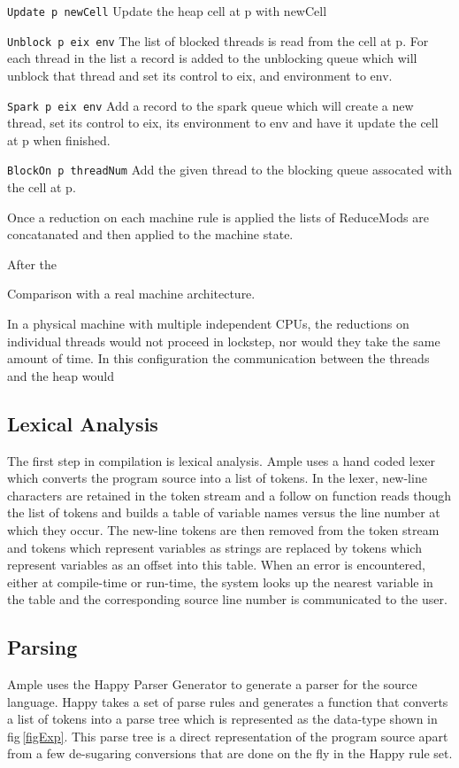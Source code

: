 \texttt{Update  p newCell}
Update the heap cell at p with newCell

\texttt{Unblock p eix env} 
The list of blocked threads is read from the cell at p. For each thread in the list a record is added to the unblocking queue which will unblock that thread and set its control to eix, and environment to env.

\texttt{Spark   p eix env}
Add a record to the spark queue which will create a new thread, set its control to eix, its environment to env and have it update the cell at p when finished.

\texttt{BlockOn p threadNum}
Add the given thread to the blocking queue assocated with the cell at p.

Once a reduction on each machine rule is applied the lists of ReduceMods are concatanated and then applied to the machine state. 
  



After the 

Comparison with a real machine architecture.

In a physical machine with multiple independent CPUs, the reductions on individual threads would not proceed in lockstep, nor would they take the same amount of time. In this configuration the communication between the threads and the heap would 



\subsection{Lexical Analysis}
The first step in compilation is lexical analysis. Ample uses a hand coded lexer which converts the program source into a list of tokens. In the lexer, new-line characters are retained in the token stream and a follow on function reads though the list of tokens and builds a table of variable names versus the line number at which they occur. The new-line tokens are then removed from the token stream and tokens which represent variables as strings are replaced by tokens which represent variables as an offset into this table. When an error is encountered, either at compile-time or run-time, the system looks up the nearest variable in the table and the corresponding source line number is communicated to the user.


\subsection{Parsing}
Ample uses the Happy Parser Generator \cite{Happy} to generate a parser for the source language. Happy takes a set of parse rules and generates a function that converts a list of tokens into a parse tree which is represented as the data-type shown in fig\,\ref{figExp}. This parse tree is a direct representation of the program source apart from a few de-sugaring conversions that are done on the fly in the Happy rule set.


